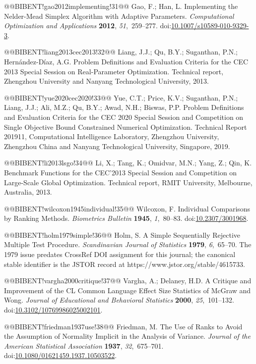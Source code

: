 \documentclass[10pt,a4paper]{article}
\begin{document}
@@BIBENT!gao2012implementing!31@@ Gao, F.; Han, L. Implementing the {Nelder-Mead} Simplex Algorithm with Adaptive Parameters. \emph{Computational Optimization and Applications} \textbf{2012}, \emph{51},~259--277. doi:{\href{https://doi.org/10.1007/s10589-010-9329-3}{10.1007/s10589-010-9329-3}}.

@@BIBENT!liang2013cec2013!32@@ Liang, J.J.; Qu, B.Y.; Suganthan, P.N.; Hern{\'a}ndez-D{\'i}az, A.G. Problem Definitions and Evaluation Criteria for the {CEC} 2013 Special Session on Real-Parameter Optimization. Technical report, Zhengzhou University and Nanyang Technological University, 2013.

@@BIBENT!yue2020cec2020!33@@ Yue, C.T.; Price, K.V.; Suganthan, P.N.; Liang, J.J.; Ali, M.Z.; Qu, B.Y.; Awad, N.H.; Biswas, P.P. Problem Definitions and Evaluation Criteria for the {CEC} 2020 Special Session and Competition on Single Objective Bound Constrained Numerical Optimization. Technical Report 201911, Computational Intelligence Laboratory, Zhengzhou University, Zhengzhou China and Nanyang Technological University, Singapore, 2019.

@@BIBENT!li2013lsgo!34@@ Li, X.; Tang, K.; Omidvar, M.N.; Yang, Z.; Qin, K. Benchmark Functions for the {CEC}'2013 Special Session and Competition on Large-Scale Global Optimization. Technical report, RMIT University, Melbourne, Australia, 2013.

@@BIBENT!wilcoxon1945individual!35@@ Wilcoxon, F. Individual Comparisons by Ranking Methods. \emph{Biometrics Bulletin} \textbf{1945}, \emph{1},~80--83. doi:{\href{https://doi.org/10.2307/3001968}{10.2307/3001968}}.

@@BIBENT!holm1979simple!36@@ Holm, S. A Simple Sequentially Rejective Multiple Test Procedure. \emph{Scandinavian Journal of Statistics} \textbf{1979}, \emph{6},~65--70. The 1979 issue predates CrossRef DOI assignment for this journal; the canonical stable identifier is the JSTOR record at https://www.jstor.org/stable/4615733.

@@BIBENT!vargha2000critique!37@@ Vargha, A.; Delaney, H.D. A Critique and Improvement of the {CL} Common Language Effect Size Statistics of {McGraw} and {Wong}. \emph{Journal of Educational and Behavioral Statistics} \textbf{2000}, \emph{25},~101--132. doi:{\href{https://doi.org/10.3102/10769986025002101}{10.3102/10769986025002101}}.

@@BIBENT!friedman1937use!38@@ Friedman, M. The Use of Ranks to Avoid the Assumption of Normality Implicit in the Analysis of Variance. \emph{Journal of the American Statistical Association} \textbf{1937}, \emph{32},~675--701. doi:{\href{https://doi.org/10.1080/01621459.1937.10503522}{10.1080/01621459.1937.10503522}}.
\end{document}
